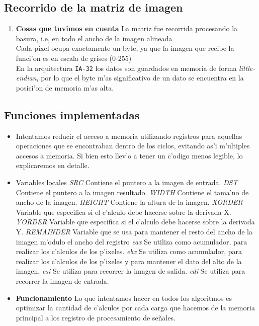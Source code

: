 \documentclass[11pt]{article}
\begin{document}
\newpage
\subsection{Recorrido de la matriz de imagen}
\begin{enumerate}
\item \textbf{Cosas que tuvimos en cuenta} 
\subitem La matriz fue recorrida procesando la basura, i.e, en todo el ancho de la imagen alineada \\
\subitem Cada pixel ocupa exactamente un byte, ya que la imagen que recibe la funci'on es en escala de grises (0-255)  \\
\subitem En la arquitectura \verb'IA-32' los datos son guardados en memoria de forma \emph{little-endian}, por lo que el byte m'as significativo de un dato se encuentra en la posici'on de memoria m'as alta.
\end{enumerate}

\subsection{Funciones implementadas}
\begin{itemize}
\item Intentamos reducir el acceso a memoria utilizando registros para aquellas operaciones que se encontraban dentro de los ciclos, evitando as'i m'ultiples accesos a memoria. Si bien esto llev'o a tener un c'odigo menos legible, lo explicaremos en detalle.
\item Variables locales
\subitem \textit{SRC} Contiene el puntero a la imagen de entrada.
\subitem \textit{DST} Contiene el puntero a la imagen resultado.
\subitem \textit{WIDTH} Contiene el tama'no de ancho de la imagen.
\subitem \textit{HEIGHT} Contiene la altura de la imagen.
\subitem \textit{XORDER} Variable que especifica si el c'alculo debe hacerse sobre la derivada X.
\subitem \textit{YORDER} Variable que especifica si el c'alculo debe hacerse sobre la derivada Y.
\subitem \textit{REMAINDER} Variable que se usa para mantener el resto del ancho de la imagen m'odulo el ancho del registro 
\subitem \textit{eax} Se utiliza como acumulador, para realizar los c'alculos de los p'ixeles.
\subitem \textit{ebx} Se utiliza como acumulador, para realizar los c'alculos de los p'ixeles y para mantener el dato del alto de la imagen.
\subitem \textit{esi} Se utiliza para recorrer la imagen de salida.
\subitem \textit{edi} Se utiliza para recorrer la imagen de entrada.
\item \textbf{Funcionamiento}
\subitem Lo que intentamos hacer en todos los algoritmos es optimizar la cantidad de c'alculos por cada carga que hacemos de la memoria principal a los registro de procesamiento de se\~{n}ales.
\end{itemize}
\end{document}
